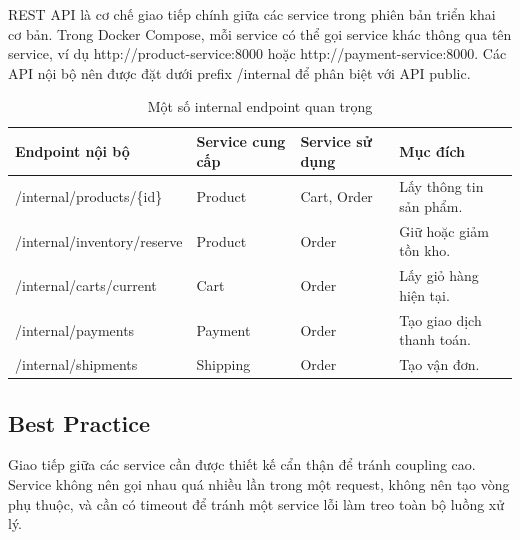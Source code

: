 \documentclass[../main.tex]{subfiles}
\begin{document}
REST API là cơ chế giao tiếp chính giữa các service trong phiên bản triển khai cơ bản. Trong Docker Compose, mỗi service có thể gọi service khác thông qua tên service, ví dụ http://product-service:8000 hoặc http://payment-service:8000. Các API nội bộ nên được đặt dưới prefix /internal để phân biệt với API public.

\begin{table}[H]
    \centering
    \caption{Một số internal endpoint quan trọng}
    \label{tab:chapter4-internal-endpoints}
    \begin{tabular}{|p{}|p{}|p{}|p{}|}
        \hline
        \rowcolor{primary!35}
        \textbf{Endpoint nội bộ} & \textbf{Service cung cấp} & \textbf{Service sử dụng} & \textbf{Mục đích} \\
        \hline
        /internal/products/\{id\} & Product & Cart, Order & Lấy thông tin sản phẩm. \\
        \hline
        /internal/inventory/reserve & Product & Order & Giữ hoặc giảm tồn kho. \\
        \hline
        /internal/carts/current & Cart & Order & Lấy giỏ hàng hiện tại. \\
        \hline
        /internal/payments & Payment & Order & Tạo giao dịch thanh toán. \\
        \hline
        /internal/shipments & Shipping & Order & Tạo vận đơn. \\
        \hline
    \end{tabular}
\end{table}

\subsection{Best Practice}
\label{subsection:4.5.2}

Giao tiếp giữa các service cần được thiết kế cẩn thận để tránh coupling cao. Service không nên gọi nhau quá nhiều lần trong một request, không nên tạo vòng phụ thuộc, và cần có timeout để tránh một service lỗi làm treo toàn bộ luồng xử lý.
\end{document}
